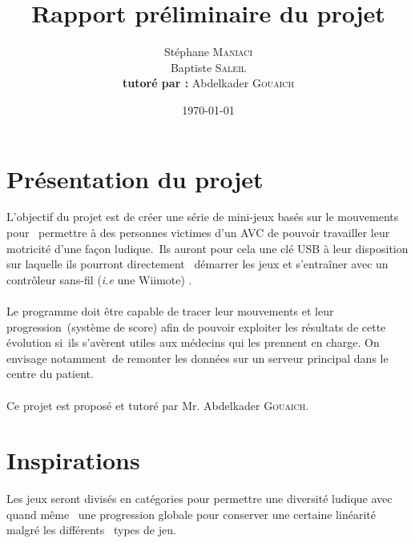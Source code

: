 \documentclass[a4paper]{article}
\begin{document}
\title{Rapport préliminaire du projet}
\author{Stéphane \textsc{Maniaci} \\
	Baptiste \textsc{Saleil} \\
	\textbf{tutoré par :} Abdelkader \textsc{Gouaich}}
\date\today

\maketitle

\tableofcontents

\clearpage

\part{Présentation du projet}

L'objectif du projet est de créer une série de mini-jeux basés sur le mouvements pour \
permettre à des personnes victimes d'un AVC de pouvoir travailler leur motricité d'une façon ludique.\
Ils auront pour cela une clé USB à leur disposition sur laquelle ils pourront directement \
démarrer les jeux et s'entraîner avec un contrôleur sans-fil (\textit{i.e} une Wiimote) . \
\\ \\
Le programme doit être capable de tracer leur mouvements et leur progression\
(système de score) afin de pouvoir exploiter les résultats de cette évolution si\
ils s'avèrent utiles aux médecins qui les prennent en charge. On envisage notamment\
de remonter les données sur un serveur principal dans le centre du patient.
\\ \\
Ce projet est proposé et tutoré par Mr. Abdelkader \textsc{Gouaich}.

\clearpage

\part{Inspirations}

Les jeux seront divisés en catégories pour permettre une diversité ludique avec quand même \
une progression globale pour conserver une certaine linéarité malgré les différents \
types de jeu.
\end{document}
